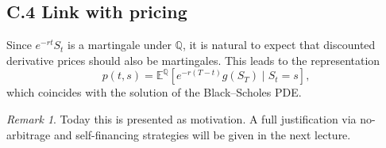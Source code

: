 \documentclass[11pt]{article}
\theoremstyle{definition}
\theoremstyle{remark}
\newtheorem{remark}[theorem]{Remark}
\newcommand{\Qbb}{\mathbb{Q}}
\newcommand{\E}{\mathbb{E}}
\newcommand{\1}{\mathbf{1}}
\theoremstyle{definition}
\begin{document}
\subsection*{C.4 Link with pricing}

Since $e^{-rt}S_t$ is a martingale under $\Qbb$, it is natural to expect that
discounted derivative prices should also be martingales.
This leads to the representation
\[
p(t,s)
=
\E^{\Qbb}\!\left[e^{-r(T-t)}g(S_T)\mid S_t=s\right],
\]
which coincides with the solution of the Black--Scholes PDE.

\begin{remark}
Today this is presented as motivation.
A full justification via no-arbitrage and self-financing strategies
will be given in the next lecture.
\end{remark}
\end{document}
